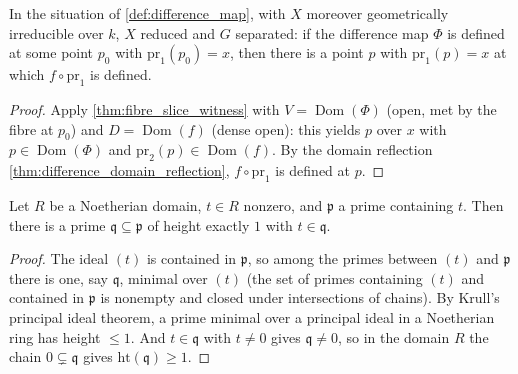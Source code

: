 \begin{theorem}
  \label{thm:difference_slice_witness}
  \leanok
  In the situation of \ref{def:difference_map}, with \(X\) moreover
  geometrically irreducible over \(k\), \(X\) reduced and \(G\) separated:
  if the difference map \(\Phi\) is defined at some point \(p_0\) with
  \(\mathrm{pr}_1(p_0) = x\), then there is a point \(p\) with
  \(\mathrm{pr}_1(p) = x\) at which \(f \circ \mathrm{pr}_1\) is defined.
\end{theorem}
\begin{proof}
  \leanok
  Apply \ref{thm:fibre_slice_witness} with \(V = \operatorname{Dom}(\Phi)\)
  (open, met by the fibre at \(p_0\)) and \(D = \operatorname{Dom}(f)\)
  (dense open): this yields \(p\) over \(x\) with \(p \in
  \operatorname{Dom}(\Phi)\) and \(\mathrm{pr}_2(p) \in \operatorname{Dom}(f)\).
  By the domain reflection \ref{thm:difference_domain_reflection}, \(f \circ
  \mathrm{pr}_1\) is defined at \(p\).
\end{proof}

\begin{theorem}
  \label{thm:krull_height_one_transport}
  \leanok
  Let \(R\) be a Noetherian domain, \(t \in R\) nonzero, and \(\mathfrak p\) a
  prime containing \(t\). Then there is a prime
  \(\mathfrak q \subseteq \mathfrak p\) of height exactly \(1\) with
  \(t \in \mathfrak q\).
\end{theorem}
\begin{proof}
  \leanok
  The ideal \((t)\) is contained in \(\mathfrak p\), so among the primes between
  \((t)\) and \(\mathfrak p\) there is one, say \(\mathfrak q\), minimal over
  \((t)\) (the set of primes containing \((t)\) and contained in
  \(\mathfrak p\) is nonempty and closed under intersections of chains). By
  Krull's principal ideal theorem, a prime minimal over a principal ideal in a
  Noetherian ring has height \(\leq 1\). And \(t \in \mathfrak q\) with
  \(t \neq 0\) gives \(\mathfrak q \neq 0\), so in the domain \(R\) the chain
  \(0 \subsetneq \mathfrak q\) gives \(\mathrm{ht}(\mathfrak q) \geq 1\).
\end{proof}

